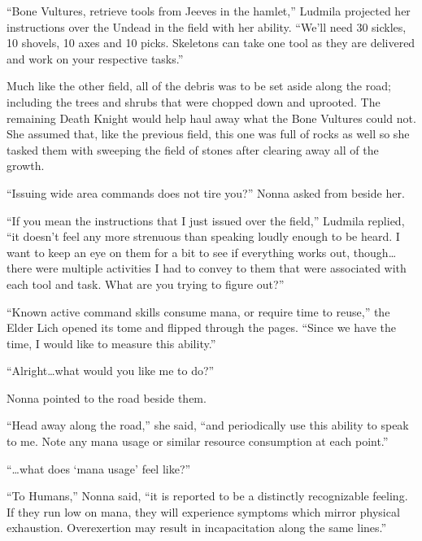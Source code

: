  

“Bone Vultures, retrieve tools from Jeeves in the hamlet,” Ludmila projected her instructions over the Undead in the field with her ability. “We’ll need 30 sickles, 10 shovels, 10 axes and 10 picks. Skeletons can take one tool as they are delivered and work on your respective tasks.”

 

Much like the other field, all of the debris was to be set aside along the road; including the trees and shrubs that were chopped down and uprooted. The remaining Death Knight would help haul away what the Bone Vultures could not. She assumed that, like the previous field, this one was full of rocks as well so she tasked them with sweeping the field of stones after clearing away all of the growth.

 

“Issuing wide area commands does not tire you?” Nonna asked from beside her.

 

“If you mean the instructions that I just issued over the field,” Ludmila replied, “it doesn't feel any more strenuous than speaking loudly enough to be heard. I want to keep an eye on them for a bit to see if everything works out, though…there were multiple activities I had to convey to them that were associated with each tool and task. What are you trying to figure out?”

 

“Known active command skills consume mana, or require time to reuse,” the Elder Lich opened its tome and flipped through the pages. “Since we have the time, I would like to measure this ability.”

 

“Alright…what would you like me to do?”

 

Nonna pointed to the road beside them.

 

“Head away along the road,” she said, “and periodically use this ability to speak to me. Note any mana usage or similar resource consumption at each point.”

 

“…what does ‘mana usage’ feel like?”

 

“To Humans,” Nonna said, “it is reported to be a distinctly recognizable feeling. If they run low on mana, they will experience symptoms which mirror physical exhaustion. Overexertion may result in incapacitation along the same lines.”

